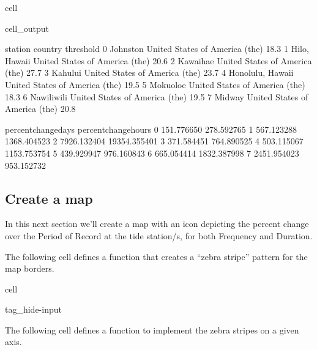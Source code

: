 \documentclass[letterpaper,10pt,english]{jupyterBook}
\begin{document}
\begin{sphinxuseclass}{cell}
\begin{sphinxVerbatimOutput}
\begin{sphinxuseclass}{cell_output}
\begin{sphinxVerbatim}[commandchars=\\\{\}]
            station                         country  threshold  \PYGZbs{}
0          Johnston  United States of America (the)       18.3   
1      Hilo, Hawaii  United States of America (the)       20.6   
2          Kawaihae  United States of America (the)       27.7   
3           Kahului  United States of America (the)       23.7   
4  Honolulu, Hawaii  United States of America (the)       19.5   
5          Mokuoloe  United States of America (the)       18.3   
6        Nawiliwili  United States of America (the)       19.5   
7            Midway  United States of America (the)       20.8   

   percent\PYGZus{}change\PYGZus{}days  percent\PYGZus{}change\PYGZus{}hours  
0           151.776650            278.592765  
1           567.123288           1368.404523  
2          7926.132404          19354.355401  
3           371.584451            764.890525  
4           503.115067           1153.753754  
5           439.929947            976.160843  
6           665.054414           1832.387998  
7          2451.954023            953.152732  
\end{sphinxVerbatim}

\end{sphinxuseclass}\end{sphinxVerbatimOutput}

\end{sphinxuseclass}

\subsection{Create a map}
\label{\detokenize{notebooks/FloodFrequency:create-a-map}}
\sphinxAtStartPar
In this next section we’ll create a map with an icon depicting the percent change over the Period of Record at the tide station/s, for both Frequency and Duration.

\sphinxAtStartPar
The following cell defines a function that creates a “zebra stripe” pattern for the map borders.

\begin{sphinxuseclass}{cell}
\begin{sphinxuseclass}{tag_hide-input}
\end{sphinxuseclass}
\end{sphinxuseclass}
\sphinxAtStartPar
The following cell defines a function to implement the zebra stripes on a given axis.
\end{document}

